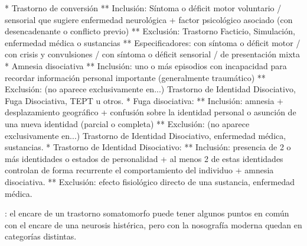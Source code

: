 \documentclass{scrbook}
\begin{document}
* Trastorno de conversión
** Inclusión: Síntoma o déficit motor voluntario / sensorial que sugiere enfermedad neurológica + factor psicológico asociado (con desencadenante o conflicto previo)
** Exclusión: Trastorno Facticio, Simulación, enfermedad médica o sustancias
** Especificadores: con síntoma o déficit motor / con crisis y convulsiones / con síntoma o déficit sensorial / de presentación mixta
* Amnesia disociativa
** Inclusión: uno o más episodios con incapacidad para recordar información personal importante (generalmente traumático)
** Exclusión: (no aparece exclusivamente en...) Trastorno de Identidad Disociativo, Fuga Disociativa, TEPT u otros.
* Fuga disociativa:
** Inclusión: amnesia + desplazamiento geográfico + confusión sobre la identidad personal o asunción de una nueva identidad (parcial o completa)
** Exclusión: (no aparece exclusivamente en...) Trastorno de Identidad Disociativo, enfermedad médica, sustancias.
* Trastorno de Identidad Disociativo:
** Inclusión: presencia de 2 o más identidades o estados de personalidad + al menos 2 de estas identidades controlan de forma recurrente el comportamiento del individuo + amnesia disociativa.
** Exclusión: efecto fisiológico directo de una sustancia, enfermedad médica.

\faTrafficLight: el encare de un trastorno somatomorfo puede tener algunos puntos en común con el encare de una neurosis histérica, pero con la nosografía moderna quedan en categorías distintas.
\end{document}
